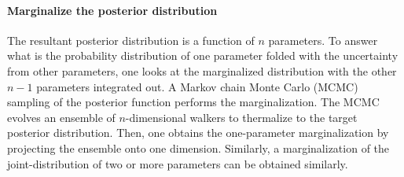 \paragraph{Marginalize the posterior distribution} The resultant posterior distribution is a function of $n$ parameters.
To answer what is the probability distribution of one parameter folded with the uncertainty from other parameters, one looks at the marginalized distribution with the other $n-1$ parameters integrated out.
A Markov chain Monte Carlo (MCMC) sampling of the posterior function performs the marginalization.
The MCMC evolves an ensemble of $n$-dimensional walkers to thermalize to the target posterior distribution.
Then, one obtains the one-parameter marginalization by projecting the ensemble onto one dimension.
Similarly, a marginalization of the joint-distribution of two or more parameters can be obtained similarly.